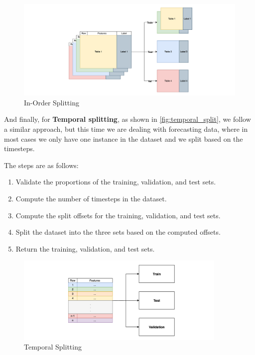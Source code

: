 \documentclass[review]{AIM_report}
\begin{document}
\begin{figure}[H]
    \centering
    \includegraphics[width=1\textwidth]{files/splitting/in_order_split.png}
    \caption{In-Order Splitting}
    \label{fig:in_order_split}
\end{figure}

And finally, for \textbf{Temporal splitting}, as shown in \autoref{fig:temporal_split}, we follow a similar approach, but this time we are dealing with forecasting data, where in most cases we only have one instance in the dataset and we split based on the timesteps.

The steps are as follows:
\begin{enumerate}
    \item Validate the proportions of the training, validation, and test sets.
    \item Compute the number of timesteps in the dataset.
    \item Compute the split offsets for the training, validation, and test sets.
    \item Split the dataset into the three sets based on the computed offsets.
    \item Return the training, validation, and test sets.
\end{enumerate}

\begin{figure}[H]
    \centering
    \includegraphics[width=0.9\textwidth]{files/splitting/temporal_split.png}
    \caption{Temporal Splitting}
    \label{fig:temporal_split}
\end{figure}
\end{document}
